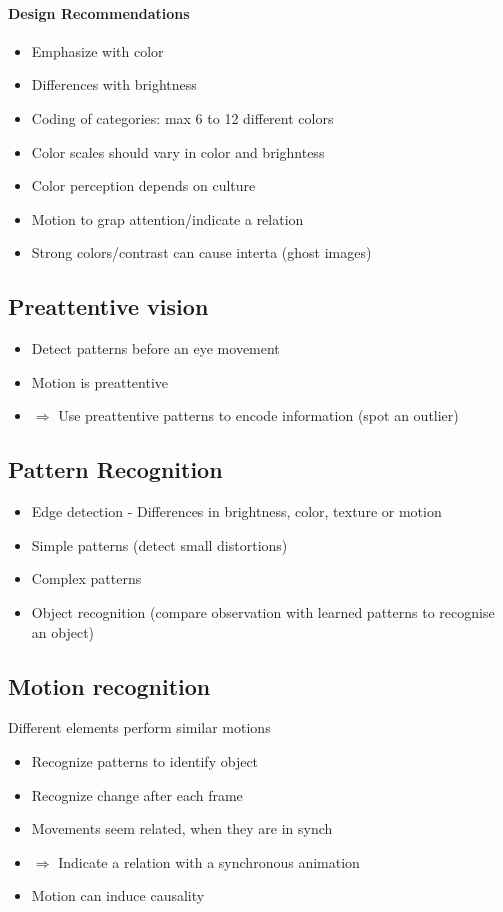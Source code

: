\documentclass[10pt,a4paper]{article}
\begin{document}
	\paragraph*{Design Recommendations}
	\begin{itemize}
		\item Emphasize with color
		\item Differences with brightness
		\item Coding of categories: max 6 to 12 different colors
		\item Color scales should vary in color and brighntess 
		\item Color perception depends on culture
		\item Motion to grap attention/indicate a relation
		\item Strong colors/contrast can cause interta (ghost images)
	\end{itemize}
	
	
	\subsection{Preattentive vision}
	\begin{itemize}
		\item Detect patterns before an eye movement
		\item Motion is preattentive
		\item $ \Rightarrow $ Use preattentive patterns to encode information (spot an outlier)
	\end{itemize}
	
	\subsection{Pattern Recognition}
	\begin{itemize}
		\item Edge detection - Differences in brightness, color, texture or motion
		\item Simple patterns (detect small distortions)
		\item Complex patterns
		\item Object recognition (compare observation with learned patterns to recognise an object)
	\end{itemize}
	
	\subsection{Motion recognition}
	Different elements perform similar motions
	\begin{itemize}
		\item Recognize patterns to identify object
		\item Recognize change after each frame
		\item Movements seem related, when they are in synch
		\item $ \Rightarrow $ Indicate a relation with a synchronous animation 
		\item Motion can induce causality
	\end{itemize}
\end{document}
